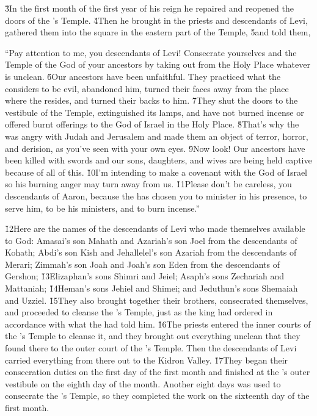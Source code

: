\v{3}In the first month of the first year of his reign he repaired and reopened the doors of the 's Temple. \v{4}Then he brought in the priests and descendants of Levi, gathered them into the square in the eastern part of the Temple, \v{5}and told them,

\begin{poetry}
\poeml ``Pay attention to me, you descendants of Levi! Consecrate yourselves and the Temple of the  God of your ancestors by taking out from the Holy Place whatever is unclean. \v{6}Our ancestors have been unfaithful. They practiced what the  considers to be evil, abandoned him, turned their faces away from the place where the  resides, and turned their backs to him. \v{7}They shut the doors to the vestibule of the Temple, extinguished its lamps, and have not burned incense or offered burnt offerings to the God of Israel in the Holy Place. \v{8}That's why the  was angry with Judah and Jerusalem and made them an object of terror, horror, and derision, as you've seen with your own eyes. \v{9}Now look! Our ancestors have been killed with swords and our sons, daughters, and wives are being held captive because of all of this. \v{10}I'm intending to make a covenant with the  God of Israel so his burning anger may turn away from us. \v{11}Please don't be careless, you descendants of Aaron, because the  has chosen you to minister in his presence, to serve him, to be his ministers, and to burn incense.''
\end{poetry}

\v{12}Here are the names of the descendants of Levi who made themselves available to God: Amasai's son Mahath and Azariah's son Joel from the descendants of Kohath; Abdi's son Kish and Jehallelel's son Azariah from the descendants of Merari; Zimmah's son Joah and Joah's son Eden from the descendants of Gershon; \v{13}Elizaphan's sons Shimri and Jeiel; Asaph's sons Zechariah and Mattaniah; \v{14}Heman's sons Jehiel and Shimei; and Jeduthun's sons Shemaiah and Uzziel. \v{15}They also brought together their brothers, consecrated themselves, and proceeded to cleanse the 's Temple, just as the king had ordered in accordance with what the  had told him. \v{16}The priests entered the inner courts of the 's Temple to cleanse it, and they brought out everything unclean that they found there to the outer court of the 's Temple. Then the descendants of Levi carried everything from there out to the Kidron Valley. \v{17}They began their consecration duties on the first day of the first month and finished at the 's outer vestibule on the eighth day of the month. Another eight days was used to consecrate the 's Temple, so they completed the work on the sixteenth day of the first month.

